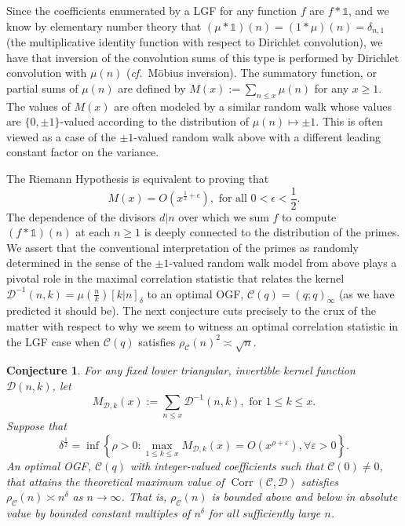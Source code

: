 \documentclass[12pt,reqno,a4letter]{article}
\numberwithin{figure}{section}
\numberwithin{table}{section}
\numberwithin{equation}{section}
\newcommand{\cf}{\textit{cf.~}}
\newcommand{\Iverson}[1]{\ensuremath{\left[#1\right]_{\delta}}}
\theoremstyle{plain}
\newtheorem{conjecture}[theorem]{Conjecture}
\numberwithin{theorem}{section}
\theoremstyle{definition}
\begin{document}
Since the coefficients enumerated by a LGF for any function $f$ are $f \ast \mathds{1}$, and 
we know by elementary number theory that $(\mu \ast \mathds{1})(n) = (1 \ast \mu)(n) = \delta_{n,1}$ 
(the multiplicative identity function with respect to Dirichlet convolution), 
we have that inversion of the convolution sums of this type is performed by Dirichlet convolution 
with $\mu(n)$ (\cf M\"obius inversion). 
The summatory function, or partial sums of $\mu(n)$ are defined by 
$M(x) := \sum_{n \leq x} \mu(n)$ for any $x \geq 1$. 
The values of $M(x)$ are often modeled by a similar random walk whose values are $\{0,\pm 1\}$-valued 
according to the distribution of $\mu(n) \mapsto \pm 1$. 
This is often viewed as a case of the $\pm 1$-valued 
random walk above with a different leading constant factor on the variance. 

The Riemann Hypothesis is equivalent to proving that 
\[
M(x) = O\left(x^{\frac{1}{2}+\epsilon}\right), \text{ for all } 0 < \epsilon < \frac{1}{2}. 
\]
The dependence of the divisors $d|n$ over which we sum $f$ to compute 
$(f \ast \mathds{1})(n)$ at each $n \geq 1$ is deeply connected to the distribution of the primes. 
We assert that the conventional interpretation of the primes as randomly determined in the sense of the 
$\pm 1$-valued random walk model from above plays a pivotal role in the maximal correlation statistic that relates 
the kernel $\mathcal{D}^{-1}(n, k) = \mu\left(\frac{n}{k}\right) \Iverson{k|n}$ to an optimal OGF, 
$\mathcal{C}(q) = (q; q)_{\infty}$ (as we have predicted it should be). 
The next conjecture cuts precisely to the crux of the matter with respect to 
why we seem to witness an optimal correlation statistic in the LGF case 
when $\mathcal{C}(q)$ satisfies $\rho_{\mathcal{C}}(n)^2 \asymp \sqrt{n}$.

\begin{conjecture}
\label{conj_OptimalDeltaParameter_FromLGFAndMertensRHCase_v1}
For any fixed lower triangular, invertible kernel function $\mathcal{D}(n, k)$, let 
\[
M_{\mathcal{D},k}(x) := \sum_{n \leq x} \mathcal{D}^{-1}(n, k), \text{ for } 1 \leq k \leq x. 
\]
Suppose that 
\[
\delta^{\frac{1}{2}} = \inf\left\{\rho > 0: \max_{1 \leq k \leq x} M_{\mathcal{D},k}(x) = O\left(x^{\rho+\varepsilon}\right), 
     \forall \varepsilon>0\right\}. 
\]
An optimal OGF, $\mathcal{C}(q)$ with integer-valued coefficients such that $\mathcal{C}(0) \neq 0$, 
that attains the theoretical maximum value of 
$\operatorname{Corr}(\mathcal{C},\mathcal{D})$ satisfies 
$\rho_{\mathcal{C}}(n) \asymp n^{\delta}$ as $n \rightarrow \infty$. 
That is, $\rho_{\mathcal{C}}(n)$ is bounded above and below in absolute value by 
bounded constant multiples of $n^{\delta}$ for all sufficiently large $n$. 
\end{conjecture}
\end{document}
